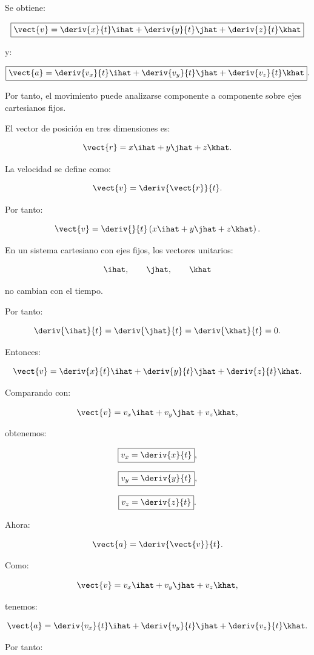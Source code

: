 \begin{respuesta}
Se obtiene:

\[
\boxed{
\vect{v}
=
\deriv{x}{t}\ihat
+
\deriv{y}{t}\jhat
+
\deriv{z}{t}\khat
}
\]

y:

\[
\boxed{
\vect{a}
=
\deriv{v_x}{t}\ihat
+
\deriv{v_y}{t}\jhat
+
\deriv{v_z}{t}\khat
}.
\]

Por tanto, el movimiento puede analizarse componente a componente sobre ejes cartesianos fijos.
\end{respuesta}

\begin{explicacion}
El vector de posición en tres dimensiones es:

\[
\vect{r}
=
x\ihat+y\jhat+z\khat.
\]

La velocidad se define como:

\[
\vect{v}
=
\deriv{\vect{r}}{t}.
\]

Por tanto:

\[
\vect{v}
=
\deriv{}{t}
\left(
x\ihat+y\jhat+z\khat
\right).
\]

En un sistema cartesiano con ejes fijos, los vectores unitarios:

\[
\ihat,\qquad
\jhat,\qquad
\khat
\]

no cambian con el tiempo.

Por tanto:

\[
\deriv{\ihat}{t}
=
\deriv{\jhat}{t}
=
\deriv{\khat}{t}
=
0.
\]

Entonces:

\[
\vect{v}
=
\deriv{x}{t}\ihat
+
\deriv{y}{t}\jhat
+
\deriv{z}{t}\khat.
\]

Comparando con:

\[
\vect{v}
=
v_x\ihat+v_y\jhat+v_z\khat,
\]

obtenemos:

\[
\boxed{
v_x=\deriv{x}{t}
},
\]

\[
\boxed{
v_y=\deriv{y}{t}
},
\]

\[
\boxed{
v_z=\deriv{z}{t}
}.
\]

Ahora:

\[
\vect{a}
=
\deriv{\vect{v}}{t}.
\]

Como:

\[
\vect{v}
=
v_x\ihat+v_y\jhat+v_z\khat,
\]

tenemos:

\[
\vect{a}
=
\deriv{v_x}{t}\ihat
+
\deriv{v_y}{t}\jhat
+
\deriv{v_z}{t}\khat.
\]

Por tanto:


\end{explicacion}
